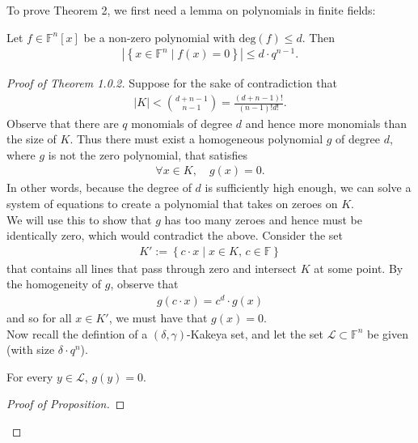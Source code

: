 \documentclass{memoir}
\begin{document}
To prove Theorem 2, we first need a lemma on polynomials in finite fields:
\begin{lemma}%
	Let \(f \in \mathbb{F}^{n}[x]\) be a non-zero polynomial with \(\textrm{deg}(f)\leq d\). Then
	\begin{align*}
		\left| \left\{x \in \mathbb{F}^{n} \mid f(x) = 0 \right\}  \right| \leq d\cdot q^{n-1}.
	\end{align*}
\end{lemma}

\begin{proof}[Proof of Theorem 1.0.2]
	Suppose for the sake of contradiction that
	\begin{align*}
		\left| K \right| < {{d+n-1}\choose{n-1}} = \frac{(d+n-1)!}{(n-1)!d!}.
	\end{align*}
	Observe that there are \(q\) monomials of degree \(d\) and hence more monomials than the size of \(K\). %
Thus there must exist a homogeneous polynomial \(g\) of degree \(d\), where \(g\) is not the zero polynomial, that satisfies
\begin{align*}
	\forall x \in K, \quad g(x) = 0.
\end{align*}
In other words, because the degree of \(d\) is sufficiently high enough, we can solve a system of equations to create a polynomial that takes on zeroes on \(K\).\\

We will use this to show that \(g\) has too many zeroes and hence must be identically zero, which would contradict the above. Consider the set
\begin{align*}
	K' := \left\{c\cdot x \mid x \in K,\, c \in \mathbb{F} \right\} 
\end{align*}
that contains all lines that pass through zero and intersect \(K\) at some point. By the homogeneity of \(g\), observe that
\begin{align*}
	g(c\cdot x) = c^{d}\cdot g(x)
\end{align*}
and so for all \(x \in K'\), we must have that \(g(x) = 0\).\\

Now recall the defintion of a \((\delta ,\gamma )\)-Kakeya set, and let the set \(\mathcal{L}\subset \mathbb{F}^{n}\) be given (with size \(\delta \cdot q^{n}\)).

\begin{prop}
	For every \(y \in \mathcal{L}\), \(g(y) = 0\).
\end{prop}

\begin{proof}[Proof of Proposition]
	

\end{proof}
\end{proof}
\end{document}
